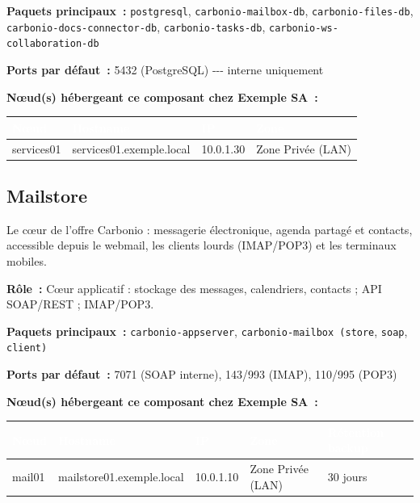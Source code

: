 \documentclass[11pt,a4paper]{report}
\newcommand{\tblhead}[1]{\textcolor{white}{\textbf{#1}}}
\begin{document}
\textbf{Paquets principaux~:} \texttt{postgresql}, \texttt{carbonio-\allowbreak{}mailbox-\allowbreak{}db}, \texttt{carbonio-\allowbreak{}files-\allowbreak{}db}, \texttt{carbonio-\allowbreak{}docs-\allowbreak{}connector-\allowbreak{}db}, \texttt{carbonio-\allowbreak{}tasks-\allowbreak{}db}, \texttt{carbonio-\allowbreak{}ws-\allowbreak{}collaboration-\allowbreak{}db}

\textbf{Ports par défaut~:} 5432 (PostgreSQL) -\allowbreak{}-\allowbreak{}-\allowbreak{} interne uniquement

\textbf{Nœud(s) hébergeant ce composant chez Exemple SA~:}
\begin{longtable}{|p{3.2cm}|p{4.5cm}|p{3.2cm}|p{2.3cm}|}
\hline
\rowcolor{primary}\tblhead{Nœud} & \tblhead{Hostname} & \tblhead{IP} & \tblhead{Zone} \\
\hline
\endhead
services01 & services01.\allowbreak{}exemple.\allowbreak{}local & 10.\allowbreak{}0.\allowbreak{}1.\allowbreak{}30 & Zone Privée (LAN) \\
\hline
\end{longtable}


\subsection{Mailstore}

Le cœur de l'offre Carbonio : messagerie électronique, agenda partagé et contacts, accessible depuis le webmail, les clients lourds (IMAP/POP3) et les terminaux mobiles.\allowbreak{}

\textbf{Rôle~:} Cœur applicatif : stockage des messages, calendriers, contacts ; API SOAP/REST ; IMAP/POP3.\allowbreak{}


\textbf{Paquets principaux~:} \texttt{carbonio-\allowbreak{}appserver}, \texttt{carbonio-\allowbreak{}mailbox (store}, \texttt{soap}, \texttt{client)}

\textbf{Ports par défaut~:} 7071 (SOAP interne), 143/993 (IMAP), 110/995 (POP3)

\textbf{Nœud(s) hébergeant ce composant chez Exemple SA~:}
\begin{longtable}{|p{2.6cm}|p{4cm}|p{2.6cm}|p{2cm}|p{2.3cm}|}
\hline
\rowcolor{primary}\tblhead{Nœud} & \tblhead{Hostname} & \tblhead{IP} & \tblhead{Zone} & \tblhead{Rétention backup} \\
\hline
\endhead
mail01 & mailstore01.\allowbreak{}exemple.\allowbreak{}local & 10.\allowbreak{}0.\allowbreak{}1.\allowbreak{}10 & Zone Privée (LAN) & 30 jours \\
\hline
\end{longtable}
\end{document}
